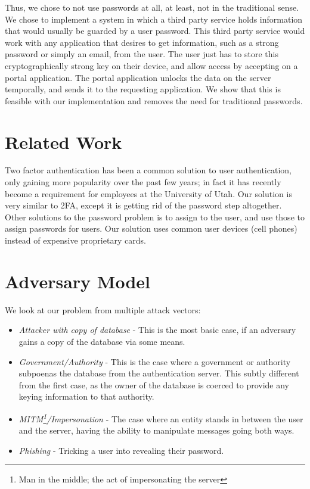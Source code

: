 \documentclass[letterpaper,twocolumn,10pt]{article}
\begin{document}
Thus, we chose to not use passwords at all, at least, not in the traditional sense. We chose to implement a system in which a third party service holds information that would usually be guarded by a user password. This third party service would work with any application that desires to get information, such as a strong password or simply an email, from the user. The user just has to store this cryptographically strong key on their device, and allow access by accepting on a portal application. The portal application unlocks the data on the server temporally, and sends it to the requesting application.  We show that this is feasible with our implementation and removes the need for traditional passwords. 

\section{Related Work}
	Two factor authentication has been a common solution to user authentication, only gaining more popularity over the past few years; in fact it has recently become a requirement for employees at the University of Utah. Our solution is very similar to 2FA, except it is getting rid of the password step altogether. Other solutions to the password problem is to assign \cite["Smart Cards"]{card} to the user, and use those to assign passwords for users. Our solution uses common user devices (cell phones) instead of expensive proprietary cards. 

\section{Adversary Model}
    We look at our problem from multiple attack vectors:
    \begin{itemize}
    \item \textit{Attacker with copy of database} - This is the most basic case, if an adversary gains a copy of the database via some means.
    \item \textit{Government/Authority} - This is the case where a government or authority subpoenas the database from the authentication server. This subtly different from the first case, as the owner of the database is coerced to provide any keying information to that authority.
    \item \textit{MITM\footnote{Man in the middle; the act of impersonating the server}/Impersonation} - The case where an entity stands in between the user and the server, having the ability to manipulate messages going both ways.
    \item \textit{Phishing} - Tricking a user into revealing their password.
    \end{itemize}
\end{document}
